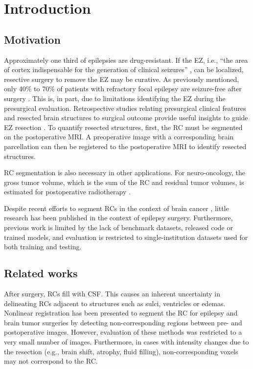 \section{Introduction}

\subsection{Motivation}

Approximately one third of epilepsies are drug-resistant.
If the \ac{EZ}, i.e., ``the area of cortex indispensable for the generation of clinical seizures'' \cite{rosenow_presurgical_2001}, can be localized, resective surgery to remove the \ac{EZ} may be curative.
As previously mentioned, only 40\% to 70\% of patients with refractory focal epilepsy are seizure-free after surgery \cite{jobst_resective_2015}.
This is, in part, due to limitations identifying the \ac{EZ} during the presurgical evaluation.
Retrospective studies relating presurgical clinical features and resected brain structures to surgical outcome provide useful insights to guide \ac{EZ} resection \cite{jobst_resective_2015}.
To quantify resected structures, first, the \ac{RC} must be segmented on the postoperative \ac{MRI}.
A preoperative image with a corresponding brain parcellation can then be registered to the postoperative \ac{MRI} to identify resected structures.

\Ac{RC} segmentation is also necessary in other applications.
For neuro-oncology, the gross tumor volume, which is the sum of the \ac{RC} and residual tumor volumes, is estimated for postoperative radiotherapy \cite{ermis_fully_2020}.

Despite recent efforts to segment \acp{RC} in the context of brain cancer \cite{meier_automatic_2017,ermis_fully_2020}, little research has been published in the context of epilepsy surgery.
Furthermore, previous work is limited by the lack of benchmark datasets, released code or trained models, and evaluation is restricted to single-institution datasets used for both training and testing.


\subsection{Related works}

After surgery, \acp{RC} fill with \ac{CSF}.
This causes an inherent uncertainty in delineating \acp{RC} adjacent to structures such as sulci, ventricles or edemas.
Nonlinear registration has been presented to segment the \ac{RC} for epilepsy \cite{chitphakdithai_non-rigid_2010} and brain tumor \cite{chen_deformable_2015} surgeries by detecting non-corresponding regions between pre- and postoperative images.
However, evaluation of these methods was restricted to a very small number of images.
Furthermore, in cases with intensity changes due to the resection (e.g., brain shift, atrophy, fluid filling), non-corresponding voxels may not correspond to the \ac{RC}.

